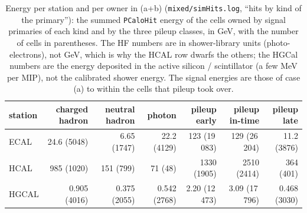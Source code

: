 \documentclass[11pt,a4paper]{article}
\newcommand{\code}[1]{\texttt{#1}}
\begin{document}
\begin{table}[H]
\centering\small
\caption{Energy per station and per owner in (a+b) (\code{mixed/simHits.log}, ``hits by kind of the
primary''): the summed \code{PCaloHit} energy of the cells owned by signal primaries of each kind and by the
three pileup classes, in GeV, with the number of cells in parentheses. The HF numbers are in shower-library
units (photo-electrons), not GeV, which is why the HCAL row dwarfs the others; the HGCal numbers are the
energy deposited in the active silicon / scintillator (a few MeV per MIP), not the calibrated shower energy.
The signal energies are those of case (a) to within the cells that pileup took over.}
\label{tab:energy}
\setlength{\tabcolsep}{4pt}
\begin{tabular}{lrrrrrr}
\toprule
station & \textcolor{sigchg}{charged hadron} & \textcolor{signeu}{neutral hadron} & \textcolor{sigpho}{photon} & \textcolor{puearly}{pileup early} & \textcolor{puintime}{pileup in-time} & \textcolor{pulate}{pileup late} \\
\midrule
ECAL   & 24.6 (5048) & 6.65 (1747) & 22.2 (4129) & 123 (19\,083) & 129 (26\,204) & 11.2 (3876) \\
HCAL   & 985 (1020)  & 151 (799)   & 71 (48)     & 1330 (1905)   & 2510 (2414)   & 364 (401) \\
HGCAL  & 0.905 (4016) & 0.375 (2055) & 0.542 (2768) & 2.20 (12\,473) & 3.09 (17\,796) & 0.468 (3030) \\
\bottomrule
\end{tabular}
\end{table}
\end{document}
